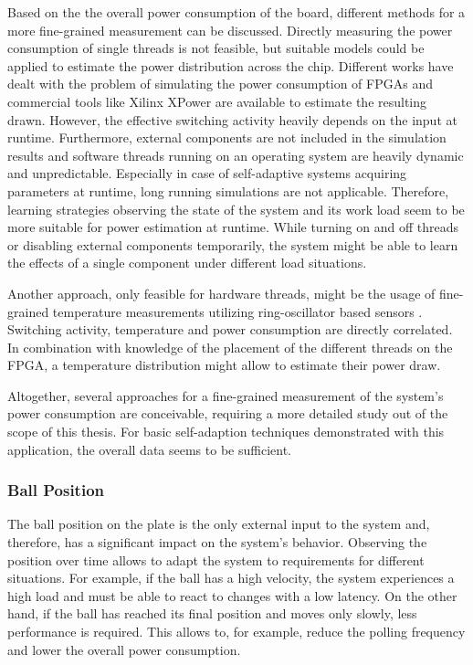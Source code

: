 Based on the the overall power consumption of the board, different methods for
a more fine-grained measurement can be discussed. Directly measuring the power
consumption of single threads is not feasible, but suitable models could be
applied to estimate the power distribution across the chip. Different works
have dealt with the problem of simulating the power consumption of \acp{FPGA}
\citep{DeTu05,JeCa11} and commercial tools like Xilinx XPower are available to
estimate the resulting drawn. However, the effective switching activity
heavily depends on the input at runtime. Furthermore, external components are
not included in the simulation results and software threads running on an
operating system are heavily dynamic and unpredictable. Especially in case of
self-adaptive systems acquiring parameters at runtime, long running
simulations are not applicable. Therefore, learning strategies observing the
state of the system and its work load seem to be more suitable for power
estimation at runtime. While turning on and off threads or disabling external
components temporarily, the system might be able to learn the effects of a
single component under different load situations.

Another approach, only feasible for hardware threads, might be the usage of
fine-grained temperature measurements utilizing ring-oscillator based sensors
\citep{RAH12,JJR13}. Switching activity, temperature and power consumption are
directly correlated. In combination with knowledge of the placement of the
different threads on the \ac{FPGA}, a temperature distribution might allow to
estimate their power draw.

Altogether, several approaches for a fine-grained measurement of the system's
power consumption are conceivable, requiring a more detailed study out of the
scope of this thesis. For basic self-adaption techniques demonstrated with
this application, the overall data seems to be sufficient.

\subsubsection{Ball Position}
The ball position on the plate is the only external input to the system and,
therefore, has a significant impact on the system's behavior. Observing the
position over time allows to adapt the system to requirements for different
situations. For example, if the ball has a high velocity, the system
experiences a high load and must be able to react to changes with a low
latency. On the other hand, if the ball has reached its final position and
moves only slowly, less performance is required. This allows to, for example,
reduce the polling frequency and lower the overall power consumption.

